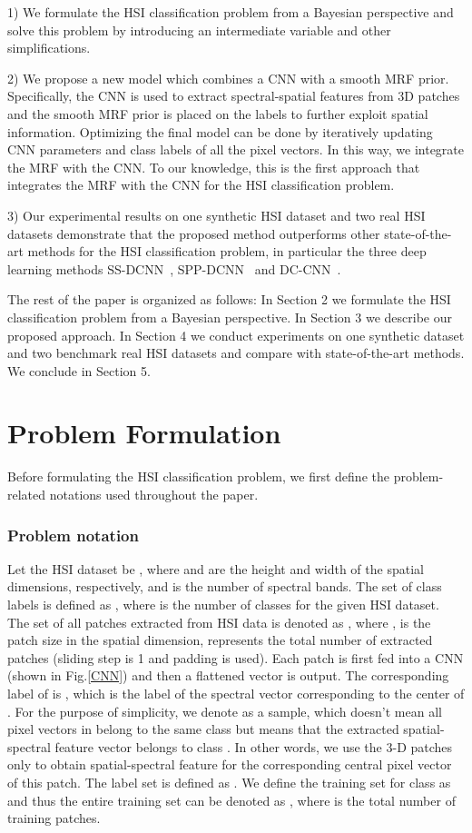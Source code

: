 \documentclass[journal]{IEEEtran}
\begin{document}
	1) We formulate the HSI {{classification}} problem from a Bayesian perspective and solve this problem by introducing an intermediate variable and other simplifications.
	
	2) {{We propose a new model which combines a CNN with a smooth MRF prior. Specifically, the CNN is used to extract spectral-spatial features from 3D patches and the smooth MRF prior is placed on the labels to further exploit spatial information. Optimizing the final model can be done by iteratively updating CNN parameters and class labels of all the pixel vectors. In this way, we integrate the MRF with the CNN. To our knowledge, this is the first approach that integrates the MRF with the CNN for the HSI classification problem.}}
	
	3) Our experimental results on one synthetic HSI dataset and two real HSI datasets demonstrate that the proposed method outperforms other state-of-the-art methods for the HSI {{classification}} problem, in particular the three deep learning methods SS-DCNN~\cite{yue2015spectral}, SPP-DCNN~\cite{yue2016deep} and DC-CNN~\cite{zhang2017spectral}.
	
	The rest of the paper is organized as follows: In Section 2 we formulate the HSI {{classification}} problem from a Bayesian perspective. In Section 3 we describe our proposed approach. In Section 4 we conduct experiments on one synthetic dataset and two benchmark real HSI datasets and compare with state-of-the-art methods. We conclude in Section 5. 
	
	\section{Problem Formulation}
	Before formulating the HSI {{classification}} problem, we first define the problem-related notations used throughout the paper.
	
	\subsubsection{Problem notation} Let the HSI dataset be , where  and  are the height and width of the spatial dimensions, respectively, and  is the number of spectral bands. The set of class labels is defined as , where  is the number of classes for the given HSI dataset. The set of all patches extracted from HSI data  is denoted as , where ,  is the patch size in the spatial dimension,  represents the total number of extracted patches (sliding step is 1 and padding is used). {{Each patch  is first fed into a CNN (shown in Fig.\ref{CNN}) and then a flattened vector  is output. The corresponding label of  is , which is the label of the spectral vector corresponding to the center of .
 For the purpose of simplicity, we denote  as a sample, which doesn't mean all pixel vectors in  belong to the same class  but means that the extracted spatial-spectral feature vector  belongs to class . In other words, we use the 3-D patches only to obtain spatial-spectral feature for the corresponding central pixel vector of this patch.}} The label set is defined as . We define the training set for class  as  and thus the entire training set can be denoted as , where  is the total number of training patches.
	
\end{document}
